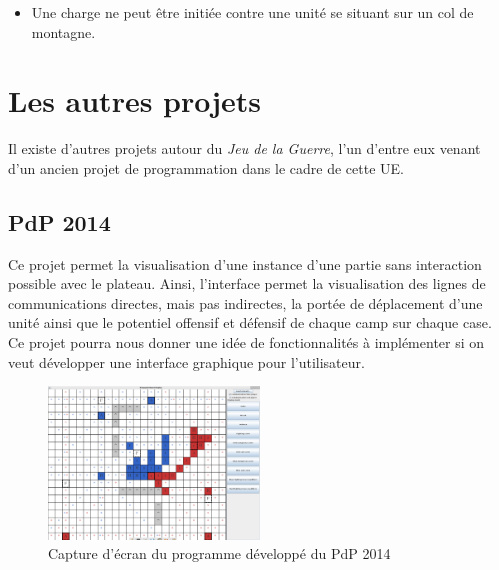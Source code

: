 \documentclass[a4paper]{report}
\begin{document}
\begin{itemize}
        \item Une charge ne peut être initiée contre une unité se situant sur un col de montagne.
    \end{itemize}

\section{Les autres projets}

Il existe d'autres projets autour du \textit{Jeu de la Guerre}, l'un d'entre eux venant d'un ancien projet de programmation dans le cadre de cette UE.


\subsection*{PdP 2014\cite{pdp2014}}
Ce projet permet la visualisation d'une instance d'une partie sans interaction possible avec le plateau. Ainsi, l'interface permet la visualisation des lignes de communications directes, mais pas indirectes, la portée de déplacement d'une unité ainsi que le potentiel offensif et défensif de chaque camp sur chaque case.
Ce projet pourra nous donner une idée de fonctionnalités à implémenter si on veut développer une interface graphique pour l'utilisateur. 


\begin{figure}[h]
\caption{Capture d'écran du programme développé du PdP 2014}
\centering
\includegraphics[width=0.5\textwidth]{pdp2014}
\end{figure}
\end{document}
